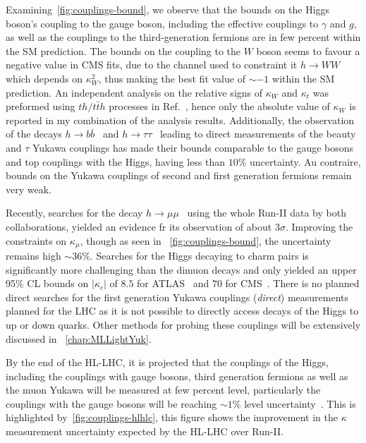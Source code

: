 \par Examining~\autoref{fig:couplings-bound}, we observe that the bounds on the Higgs boson's coupling to the gauge boson, including the effective couplings to $\gamma$ and $g$, as well as the couplings to the third-generation fermions are in few percent within the SM prediction. The bounds on the coupling to the $W$ boson seems to favour a negative value in CMS fits, due to the channel used to constraint it $ h \to WW$ which depends on $ \kappa_W^2$, thus making the best fit value of $ \sim -1$ within the SM prediction. An independent analysis on the relative signs of $\kappa_W$ and $\kappa_t$ was preformed using $th/t \bar{t} h$ processes in Ref.~\cite{CMS:2018jeh}, hence only the absolute value of $\kappa_W$ is reported in my combination of the analysis results.  Additionally,  the observation of the decays $ h \to b \bar{b}$~\cite{CMS:2018nsn,ATLAS:2018kot,ATLAS:2019yhn} and $h \to \tau \tau$~\cite{ATLAS:2018ynr,CMS:2019pyn} leading to direct measurements of the beauty and $\tau$ Yukawa couplings has  made their bounds comparable to the gauge bosons and top couplings with the Higgs, having less than $10\%$ uncertainty.  Au contraire, bounds on the Yukawa couplings of second and first generation fermions remain very weak.  
\par Recently, searches for the decay  $ h\to \mu \mu$~\cite{ATLAS:2020fzp,CMS:2020xwi} using the whole Run-II data by both collaborations, yielded an evidence fr its observation of about $ 3 \sigma$. Improving the constraints on $\kappa_\mu$, though as seen in ~\autoref{fig:couplings-bound}, the uncertainty remains high $ \sim 36 \%$.  Searches for the Higgs decaying to charm pairs is significantly more challenging than the dimuon decays and only yielded an upper 95\% CL  bounds on $ |\kappa_c|$ of $8.5$ for ATLAS~\cite{ATLAS-CONF-2021-021} and $70$ for CMS~\cite{CMS:2019hve}. There is no planned direct searches for the first generation Yukawa couplings (\emph{direct}) measurements planned for the LHC as it is not possible to directly access decays of the Higgs to up or down quarks. Other methods for probing these couplings will be extensively discussed in  ~\autoref{chap:MLLightYuk}.
\par By the end of the HL-LHC, it is projected that the couplings of the Higgs, including the couplings with gauge bosons, third generation fermions as well as the muon Yukawa will be measured at few percent level, particularly the couplings with the gauge bosons will be reaching $ \sim 1\%$ level uncertainty~\cite{Bernius:2666331}. This is highlighted by~\autoref{fig:couplings-hlhlc}, this figure shows the improvement in the $\kappa$ measurement uncertainty expected by the HL-LHC over Run-II.

